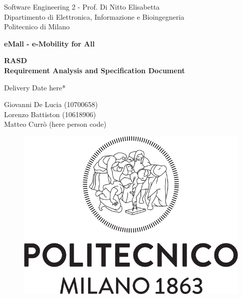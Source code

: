 \documentclass{article}
\begin{document}
\begin{titlepage}
  \centering
  {\normalsize
    Software Engineering 2 - Prof. Di Nitto Elisabetta \\
    Dipartimento di Elettronica, Informazione e Bioingegneria \\
    Politecnico di Milano \par
  }     \vspace{3cm}
  {\Huge \textbf{eMall - e-Mobility for All\\} } \vspace{1cm}
  {\large \textbf{RASD\\Requirement Analysis and Specification Document} \par} \vspace{1cm}
  {\normalsize *Delivery Date here* \par} \vspace{4cm}
  {\normalsize Giovanni De Lucia (10700658) \\ Lorenzo Battiston (10618906) \\  Matteo Currò (here person code)\par} \vspace{4cm}
  \begin{figure}[h]
    \centering
    \includegraphics[scale=0.3]{src/Logo_Politecnico_Milano.png}
  \end{figure} \vspace{0.5cm}
\end{titlepage}

\tableofcontents







\end{document}
